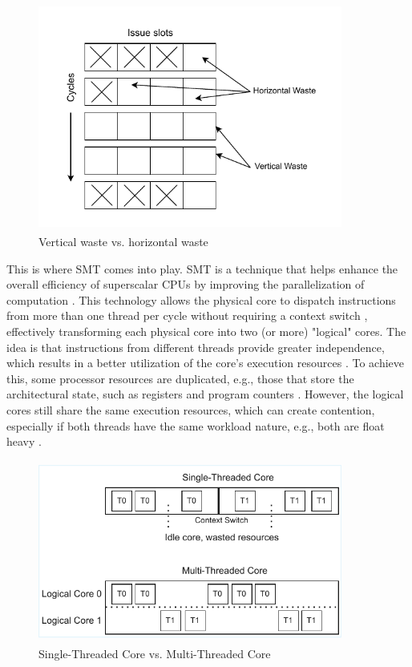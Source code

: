 \begin{figure}[H]
    \centering
    \includegraphics[width=10cm, height=7.5cm]{figures/cpu_wastages}
    \hspace{-2.5cm}
    \caption{Vertical waste vs. horizontal waste}
    \label{fig:cpu}
\end{figure}
\noindent
This is where \acl{SMT} comes into play. \acs{SMT} is a technique that helps enhance the overall efficiency of superscalar CPUs 
by improving the parallelization of computation \cite{SMT_under_the_hood}. This technology allows the 
physical core to dispatch instructions from more than one thread per cycle without requiring 
a context switch \cite{SMT_Maximizing_on_chip_parallelism}, effectively transforming each physical core into two (or more) "logical" cores. The idea is that instructions from different
threads provide greater independence, which results in a better utilization of the core's execution 
resources \cite{SMT_under_the_hood}.
To achieve this, some processor resources are duplicated, 
e.g., those that store the architectural state, such as registers and program 
counters \cite{SMT_under_the_hood}. However, the logical 
cores still share the same execution resources, which can create contention, especially if both threads have 
the same workload nature, e.g., both are float heavy \cite{SMT_modeling_resource_contention}. 
\begin{figure}[H]
    \centering
    \hspace*{-2cm} 
    \includegraphics[width=10cm, height=6cm]{figures/single_vs_multithreaded}
    \caption{Single-Threaded Core vs. Multi-Threaded Core}
    \label{fig:all}
\end{figure}

